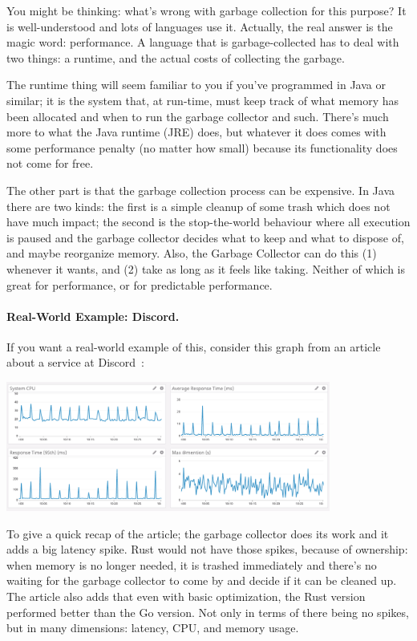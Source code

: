 \documentclass[a4paper]{report}
\begin{document}
You might be thinking: what's wrong with garbage collection for this purpose? It is well-understood and lots of languages use it. Actually, the real answer is the magic word: performance. A language that is garbage-collected has to deal with two things: a runtime, and the actual costs of collecting the garbage.

The runtime thing will seem familiar to you if you've programmed in Java or similar; it is the system that, at run-time, must keep track of what memory has been allocated and when to run the garbage collector and such. There's much more to what the Java runtime (JRE) does, but whatever it does comes with some performance penalty (no matter how small) because its functionality does not come for free. 

The other part is that the garbage collection process can be expensive. In Java there are two kinds: the first is a simple cleanup of some trash which does not have much impact; the second is the stop-the-world behaviour where all execution is paused and the garbage collector decides what to keep and what to dispose of, and maybe reorganize memory.  Also, the Garbage Collector can do this (1) whenever it wants, and (2) take as long as it feels like taking. Neither of which is great for performance, or for predictable performance.

\paragraph{Real-World Example: Discord.} If you want a real-world example of this, consider this graph from an article about a service at Discord~\cite{discord}:

\begin{center}
\includegraphics[width=0.8\textwidth]{images/golang-gc.png}
\end{center}

To give a quick recap of the article; the garbage collector does its work and it adds a big latency spike. Rust would not have those spikes, because of ownership: when memory is no longer needed, it is trashed immediately and there's no waiting for the garbage collector to come by and decide if it can be cleaned up. The article also adds that even with basic optimization, the Rust version performed better than the Go version. Not only in terms of there being no spikes, but in many dimensions: latency, CPU, and memory usage.
\end{document}
